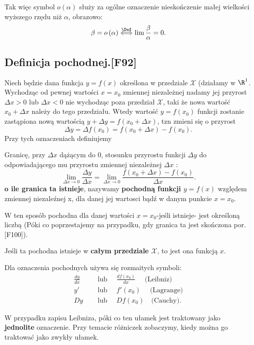 Tak więc symbol $o\left( \alpha \right) $ służy za ogólne oznaczenie nieskończenie małej wielkości wyższego rzędu niż $\alpha$, obrazowo: \[
\beta = o\left( \alpha \right) \overset{\Def}{\Longleftrightarrow} \lim \frac{\beta}{\alpha} = 0
.\] 
\subsection{Definicja pochodnej.[F92]}
Niech będzie dana funkcja $y = f\left( x \right) $ określona w przedziale $\mathcal{X}$ (działamy w $\R^{1}$. Wychodząc od pewnej wartości $x=x_0$ zmiennej niezależnej nadamy jej przyrost $\Delta x >0 $ lub $\Delta x<0$ nie wychodząc poza przedział $\mathcal{X}$, taki że nowa wartość $x_0+\Delta x$ należy do tego przedziału. Wtedy wartość $y=f\left( x_0 \right) $ funkcji zostanie zastąpiona nową wartością $y+\Delta y = f\left( x_0+\Delta x \right) $, tzn zmieni się o przyrost
\[
 \Delta y= \Delta f\left( x_0 \right) = f\left( x_0+\Delta x \right) - f\left( x_0 \right) 
.\] 
Przy tych oznaczeniach definiujemy 
\begin{definition}[Pochodna]
	Granicę, przy $\Delta x$ dążącym do 0, stosunku przyrostu funkcji $\Delta y$ do odpowiadającego mu przyrostu zmiennej niezależnej $\Delta x$ :
	\[
	\lim_{\Delta x \to 0} \frac{\Delta y}{\Delta x}= \lim_{\Delta x \to 0} \frac{f\left( x_0+\Delta x \right) - f\left( x_0 \right) }{\Delta x}
	.\] 
	\textbf{o ile granica ta istnieje}, nazywamy \textbf{pochodną funkcji $y=f\left( x \right) $} względem zmiennej niezaleźnej x, dla danej jej wartosci bądź w danym punkcie $x=x_0$. 
\end{definition} 
W ten sposób pochodna dla danej wartości $x=x_0$-jeśli istnieje- jest określoną liczbą (Póki co poprzestajemy na przypadku, gdy granica ta jest skończona por. [F100]).

Jeśli ta pochodna istnieje w \textbf{całym przedziale $\mathcal{X}$}, to jest ona funkcją $x$.

Dla oznaczenia pochodnych używa się rozmaitych symboli:
\begin{align*}
	\frac{dy}{dx}\quad &\text{ lub } \quad \frac{df\left( x_0 \right) }{dx}\quad \text{ (Leibniz)} \\
	y'\quad&\text{ lub } \quad f'\left( x_0 \right)\quad\text{ (Lagrange)}\\
		Dy \quad &\text{ lub }\quad Df\left( x_0 \right)\quad \text{(Cauchy)}
.\end{align*}

W przypadku zapisu Leibniza, póki co ten ułamek jest traktowany jako \textbf{jednolite} oznaczenie. Przy temacie różniczek zobaczymy, kiedy można go traktować jako zwykły ułamek. 

